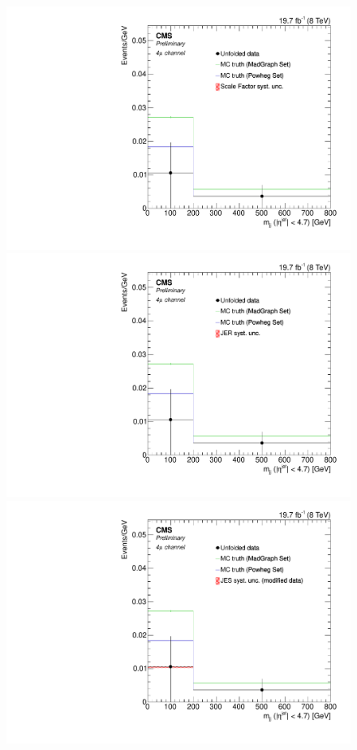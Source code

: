 \begin{figure}[hbtp]
\begin{center}
    \includegraphics[width=0.8\cmsFigWidth]{Figures/Unfolding/Systematics/ZZTo4m_Mjj_SFSq_Mad_fr}
    \includegraphics[width=0.8\cmsFigWidth]{Figures/Unfolding/Systematics/ZZTo4m_Mjj_JER_Mad_fr}
    \includegraphics[width=0.8\cmsFigWidth]{Figures/Unfolding/Systematics/ZZTo4m_Mjj_JES_ModData_Mad_fr}     

\end{center}
\end{figure}
